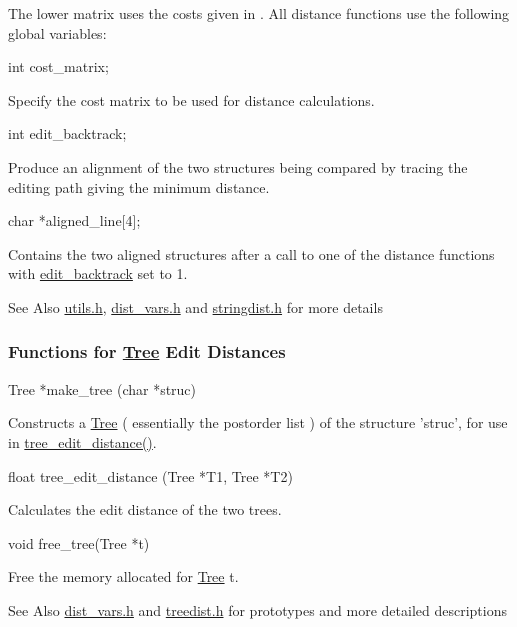 The lower matrix uses the costs given in \cite{shapiro:1990}. All distance functions use the following global variables\-:

\begin{DoxyVerb}int  cost_matrix;
\end{DoxyVerb}
 Specify the cost matrix to be used for distance calculations.

\begin{DoxyVerb}int   edit_backtrack;
\end{DoxyVerb}
 Produce an alignment of the two structures being compared by tracing the editing path giving the minimum distance.

\begin{DoxyVerb}char *aligned_line[4];
\end{DoxyVerb}
 Contains the two aligned structures after a call to one of the distance functions with \hyperlink{dist__vars_8h_aa03194c513af6b860e7b33e370b82bdb}{edit\-\_\-backtrack} set to 1.

\begin{DoxySeeAlso}{See Also}
\hyperlink{utils_8h}{utils.\-h}, \hyperlink{dist__vars_8h}{dist\-\_\-vars.\-h} and \hyperlink{stringdist_8h}{stringdist.\-h} for more details
\end{DoxySeeAlso}
\subsubsection*{Functions for \hyperlink{structTree}{Tree} Edit Distances}

\begin{DoxyVerb}Tree   *make_tree (char *struc)
\end{DoxyVerb}
 Constructs a \hyperlink{structTree}{Tree} ( essentially the postorder list ) of the structure 'struc', for use in \hyperlink{treedist_8h_a3b21f1925f7071f46d93431a835217bb}{tree\-\_\-edit\-\_\-distance()}.

\begin{DoxyVerb}float   tree_edit_distance (Tree *T1,
                            Tree *T2) 
\end{DoxyVerb}
 Calculates the edit distance of the two trees.

\begin{DoxyVerb}void    free_tree(Tree *t)
\end{DoxyVerb}
 Free the memory allocated for \hyperlink{structTree}{Tree} t.

\begin{DoxySeeAlso}{See Also}
\hyperlink{dist__vars_8h}{dist\-\_\-vars.\-h} and \hyperlink{treedist_8h}{treedist.\-h} for prototypes and more detailed descriptions
\end{DoxySeeAlso}

